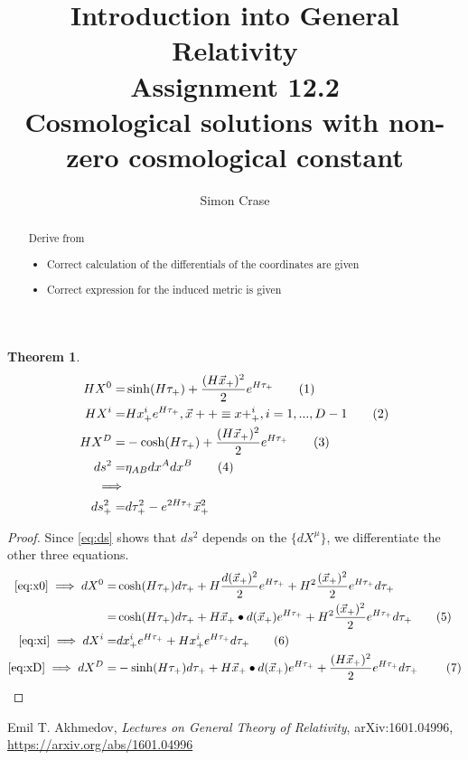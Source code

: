 \documentclass[]{article}
\title{Introduction into General Relativity\\Assignment 12.2\\Cosmological solutions with non-zero cosmological constant}
\author{Simon Crase}
\newtheorem{theorem}{Theorem}
\newcommand\numberthis{\addtocounter{equation}{1}\tag{\theequation}}
\begin{document}
\maketitle

\begin{abstract}
	Derive \cite[XII,(332)]{Akhmedov2017} from \cite[XII,(333)]{Akhmedov2017}
	\begin{itemize}
		\item     Correct calculation of the differentials of the coordinates are given
		\item Correct expression for the induced metric is given
	\end{itemize}
\end{abstract}

\begin{theorem}
	\begin{align*}
	HX^0=&\sinh(H\tau_+)+\frac{(H\vec{x}_+)^2}{2}e^{H\tau_+}\numberthis\label{eq:x0}\\
	HX^i=&Hx^i_+e^{H\tau_+}, \vec{x}++\equiv x+^i_+, i=1,...,D-1\numberthis\label{eq:xi}\\
	HX^D=&-\cosh(H\tau_+)+\frac{(H\vec{x}_+)^2}{2}e^{H\tau_+}\numberthis\label{eq:xD}\\
	ds^2=&\eta_{AB}dx^Adx^B\numberthis\label{eq:ds}\\
	\implies&\\
	ds^2_+=&d\tau^2_+ - e^{2H\tau_+}\vec{x}^2_+	
	\end{align*}
\end{theorem}
\begin{proof}
	Since \eqref{eq:ds} shows that $ds^2$ depends on the $\{dX^{\mu}\}$, we differentiate the other three equations.
	\begin{align*}
	\text{\eqref{eq:x0}}\implies dX^0=&\cosh(H\tau_+)d\tau_+ +H\frac{d(\vec{x}_+)^2}{2}e^{H\tau_+}+H^2\frac{(\vec{x}_+)^2}{2}e^{H\tau_+}d\tau_+\\
	=&\cosh(H\tau_+)d\tau_+ +H\vec{x}_+\bullet d(\vec{x}_+)e^{H\tau_+}+H^2\frac{(\vec{x}_+)^2}{2}e^{H\tau_+}d\tau_+\numberthis\label{eq:dx0}\\
	\eqref{eq:xi}\implies	dX^i=&dx^i_+e^{H\tau_+} + H x^i_+e^{H\tau_+}d\tau_+\numberthis\label{eq:dxi}\\
	\eqref{eq:xD}\implies dX^D=&-\sinh(H\tau_+)d\tau_+ +H\vec{x}_+\bullet d(\vec{x}_+)e^{H\tau_+} +\frac{(H\vec{x}_+)^2}{2}e^{H\tau_+}d\tau_+\ \numberthis\label{eq:dxD}
	\end{align*}
\end{proof}
\begin{thebibliography}{9}\label{section:biblio}
	\raggedright
	Emil T. Akhmedov,
	\emph{Lectures on General Theory of Relativity},
	arXiv:1601.04996,
	\url{https://arxiv.org/abs/1601.04996}
\end{thebibliography}
\end{document}
